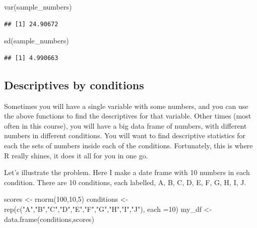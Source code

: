 \documentclass[
]{book}
\newenvironment{Shaded}{\begin{snugshade}}{\end{snugshade}}
\newcommand{\AttributeTok}[1]{\textcolor[rgb]{0.77,0.63,0.00}{#1}}
\newcommand{\DecValTok}[1]{\textcolor[rgb]{0.00,0.00,0.81}{#1}}
\newcommand{\FunctionTok}[1]{\textcolor[rgb]{0.00,0.00,0.00}{#1}}
\newcommand{\NormalTok}[1]{#1}
\newcommand{\OtherTok}[1]{\textcolor[rgb]{0.56,0.35,0.01}{#1}}
\newcommand{\StringTok}[1]{\textcolor[rgb]{0.31,0.60,0.02}{#1}}
\begin{document}
\begin{Shaded}
\begin{Highlighting}[]
\FunctionTok{var}\NormalTok{(sample\_numbers)}
\end{Highlighting}
\end{Shaded}

\begin{verbatim}
## [1] 24.90672
\end{verbatim}

\begin{Shaded}
\begin{Highlighting}[]
\FunctionTok{sd}\NormalTok{(sample\_numbers)}
\end{Highlighting}
\end{Shaded}

\begin{verbatim}
## [1] 4.990663
\end{verbatim}

\hypertarget{descriptives-by-conditions}{%
\subsection{Descriptives by conditions}\label{descriptives-by-conditions}}

Sometimes you will have a single variable with some numbers, and you can use the above functions to find the descriptives for that variable. Other times (most often in this course), you will have a big data frame of numbers, with different numbers in different conditions. You will want to find descriptive statistics for each the sets of numbers inside each of the conditions. Fortunately, this is where R really shines, it does it all for you in one go.

Let's illustrate the problem. Here I make a date frame with 10 numbers in each condition. There are 10 conditions, each labelled, A, B, C, D, E, F, G, H, I, J.

\begin{Shaded}
\begin{Highlighting}[]
\NormalTok{scores }\OtherTok{\textless{}{-}} \FunctionTok{rnorm}\NormalTok{(}\DecValTok{100}\NormalTok{,}\DecValTok{10}\NormalTok{,}\DecValTok{5}\NormalTok{)}
\NormalTok{conditions }\OtherTok{\textless{}{-}} \FunctionTok{rep}\NormalTok{(}\FunctionTok{c}\NormalTok{(}\StringTok{"A"}\NormalTok{,}\StringTok{"B"}\NormalTok{,}\StringTok{"C"}\NormalTok{,}\StringTok{"D"}\NormalTok{,}\StringTok{"E"}\NormalTok{,}\StringTok{"F"}\NormalTok{,}\StringTok{"G"}\NormalTok{,}\StringTok{"H"}\NormalTok{,}\StringTok{"I"}\NormalTok{,}\StringTok{"J"}\NormalTok{), }\AttributeTok{each =}\DecValTok{10}\NormalTok{)}
\NormalTok{my\_df }\OtherTok{\textless{}{-}} \FunctionTok{data.frame}\NormalTok{(conditions,scores)}
\end{Highlighting}
\end{Shaded}
\end{document}
